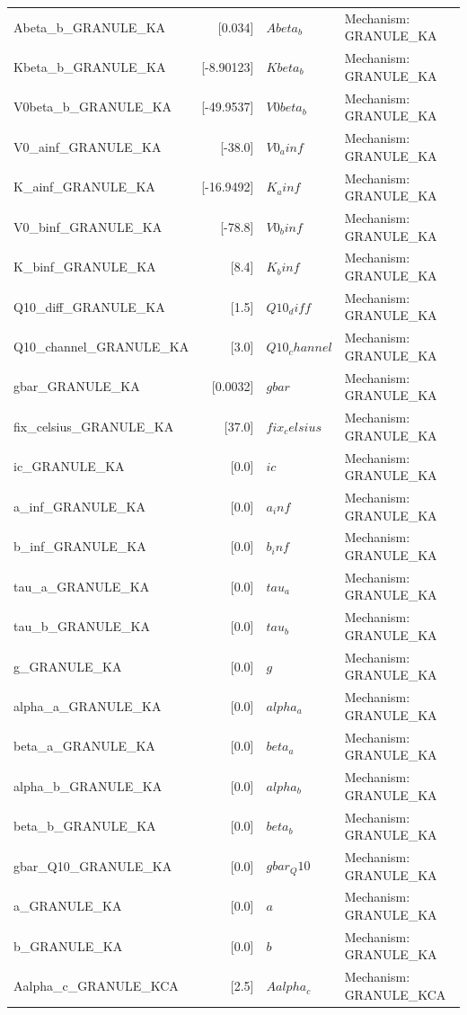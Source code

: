 \begin{tabular}{|l|r|l|l|}
Abeta_b_GRANULE_KA & [0.034] & $Abeta_b$ & Mechanism: GRANULE_KA \\
Kbeta_b_GRANULE_KA & [-8.90123] & $Kbeta_b$ & Mechanism: GRANULE_KA \\
V0beta_b_GRANULE_KA & [-49.9537] & $V0beta_b$ & Mechanism: GRANULE_KA \\
V0_ainf_GRANULE_KA & [-38.0] & $V0_ainf$ & Mechanism: GRANULE_KA \\
K_ainf_GRANULE_KA & [-16.9492] & $K_ainf$ & Mechanism: GRANULE_KA \\
V0_binf_GRANULE_KA & [-78.8] & $V0_binf$ & Mechanism: GRANULE_KA \\
K_binf_GRANULE_KA & [8.4] & $K_binf$ & Mechanism: GRANULE_KA \\
Q10_diff_GRANULE_KA & [1.5] & $Q10_diff$ & Mechanism: GRANULE_KA \\
Q10_channel_GRANULE_KA & [3.0] & $Q10_channel$ & Mechanism: GRANULE_KA \\
gbar_GRANULE_KA & [0.0032] & $gbar$ & Mechanism: GRANULE_KA \\
fix_celsius_GRANULE_KA & [37.0] & $fix_celsius$ & Mechanism: GRANULE_KA \\
ic_GRANULE_KA & [0.0] & $ic$ & Mechanism: GRANULE_KA \\
a_inf_GRANULE_KA & [0.0] & $a_inf$ & Mechanism: GRANULE_KA \\
b_inf_GRANULE_KA & [0.0] & $b_inf$ & Mechanism: GRANULE_KA \\
tau_a_GRANULE_KA & [0.0] & $tau_a$ & Mechanism: GRANULE_KA \\
tau_b_GRANULE_KA & [0.0] & $tau_b$ & Mechanism: GRANULE_KA \\
g_GRANULE_KA & [0.0] & $g$ & Mechanism: GRANULE_KA \\
alpha_a_GRANULE_KA & [0.0] & $alpha_a$ & Mechanism: GRANULE_KA \\
beta_a_GRANULE_KA & [0.0] & $beta_a$ & Mechanism: GRANULE_KA \\
alpha_b_GRANULE_KA & [0.0] & $alpha_b$ & Mechanism: GRANULE_KA \\
beta_b_GRANULE_KA & [0.0] & $beta_b$ & Mechanism: GRANULE_KA \\
gbar_Q10_GRANULE_KA & [0.0] & $gbar_Q10$ & Mechanism: GRANULE_KA \\
a_GRANULE_KA & [0.0] & $a$ & Mechanism: GRANULE_KA \\
b_GRANULE_KA & [0.0] & $b$ & Mechanism: GRANULE_KA \\
Aalpha_c_GRANULE_KCA & [2.5] & $Aalpha_c$ & Mechanism: GRANULE_KCA \\

\end{tabular}
